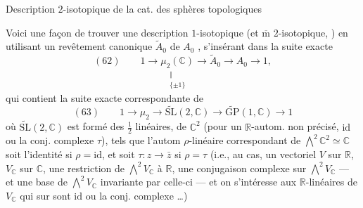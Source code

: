 \uline{} Description $2$-isotopique de la cat. des sphères topologiques

Voici une façon de trouver une description
$1$-isotopique (et $\overline{\mathrm m}$ $2$-isotopique, )
en utilisant un  revêtement canonique
$\widetilde A_0$ de $A_0$ , s'insérant dans la suite exacte
\[
(62)\qquad
1\longrightarrow\underset{\substack{\Vert\\\{\pm1\}}}{\mu_2(\mathbb C)}
\longrightarrow\widetilde A_0\longrightarrow A_0\longrightarrow1,
\]
qui contient la  suite exacte correspondante
de 
\[
(63)\qquad
1\longrightarrow\mu_2\longrightarrow\widetilde{\mathrm{SL}}(2,\mathbb C)
\longrightarrow\widetilde{\mathrm{GP}}(1,\mathbb C)\longrightarrow1
\]
où $\widetilde{\mathrm{SL}}(2,\mathbb C)$ est formé des  $\frac12$ linéaires,
de $\mathbb C^2$ (pour un $\mathbb R$-autom. \inserted{$\rho$} non précisé,
$\mathrm{id}$ ou la conj. complexe $\tau$), tels que l'autom
$\rho$-linéaire correspondant de $\bigwedge^2\mathbb C^2\simeq\mathbb C$
soit l'identité si $\rho=\mathrm{id}$, et soit $\tau:z\longrightarrow\bar z$
si $\rho=\tau$ (i.e.,  au cas, 
un vectoriel  $V$ sur $\mathbb R$, 
$V_{\mathbb C}$ sur $\mathbb C$,  une restriction de $\bigwedge^2 V_{\mathbb C}$ à $\mathbb R$,
 une conjugaison complexe sur $\bigwedge^2 V_{\mathbb C}$
--- et une  base de $\bigwedge^2 V_{\mathbb C}$ invariante par
celle-ci --- et on s'intéresse aux 
$\mathbb R$-linéaires  de $V_{\mathbb C}$ qui sur
 sont $\mathrm{id}$ ou la conj. complexe \ldots)

